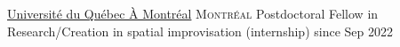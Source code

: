 \documentclass[10pt,a4paper]{article}
\begin{document}
%
%
%
%
%
%
%


\vspace{3em}
\spacedhrule{0.9em}{-0.4em}


\headedsection  %
  {\href{https://eavm.uqam.ca}{Universit\'e du Québec À Montr\'eal}}
  {\textsc{Montréal}} {%
  \headedsubsection
    {Postdoctoral Fellow in Research/Creation in spatial improvisation (internship)}
    {since Sep 2022}
    { %
}
}
\end{document}

